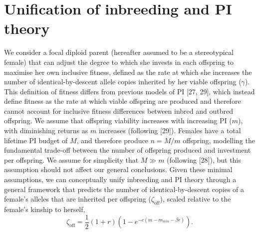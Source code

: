 \documentclass[12pt]{article}
\begin{document}
\section*{Unification of inbreeding and PI theory}

We consider a focal diploid parent (hereafter assumed to be a stereotypical female) that can adjust the degree to which she invests in each offspring to maximise her own inclusive fitness, defined as the rate at which she increases the number of identical-by-descent allele copies inherited by her viable offspring ($\gamma$). This definition of fitness differs from previous models of PI [27, 29], which instead define fitness as the rate at which viable offspring are produced and therefore cannot account for inclusive fitness differences between inbred and outbred offspring. We assume that offspring viability increases with increasing PI ($m$), with diminishing returns as $m$ increases (following [29]). Females have a total lifetime PI budget of $M$, and therefore produce $n=M/m$ offspring, modelling the fundamental trade-off between the number of offspring produced and investment per offspring. We assume for simplicity that $M \gg m$ (following [28]), but this assumption should not affect our general conclusions. Given these minimal assumptions, we can conceptually unify inbreeding and PI theory through a general framework that predicts the number of identical-by-descent copies of a female's alleles that are inherited per offspring ($\zeta_{\textrm{off}}$), scaled relative to the female's kinship to herself,
\begin{equation} \label{maineq}
\zeta_{\textrm{off}} = \frac{1}{2}\left(1+r\right)\left(1-e^{-c\left(m-m_{min}-\beta r\right)}\right).
\end{equation}
\end{document}
